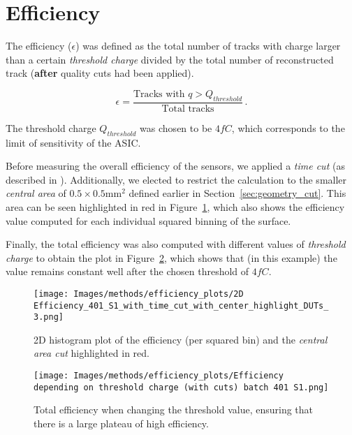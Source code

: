 \section{Efficiency}\label{sec:methods_efficiency}

The efficiency (\(\epsilon\)) was defined as the total number of tracks with charge larger than a certain \textit{threshold charge} divided by the total number of reconstructed track (\textbf{after} quality cuts had been applied).


\begin{equation*}
    \epsilon = \frac{\text{Tracks with } q>Q_{threshold}}{\text{Total tracks}}  \, .
\end{equation*}

The threshold charge \(Q_{threshold}\) was chosen to be \(4\si{fC}\), which corresponds to the limit of sensitivity of the ASIC.

Before measuring the overall efficiency of the sensors, we applied a \textit{time cut} (as described in ). Additionally, we elected to restrict the calculation to the smaller \textit{central area} of \(0.5\times0.5\unit{\milli\meter^2}\) defined earlier in Section~\ref{sec:geometry_cut}. This area can be seen highlighted in red in Figure~\ref{fig:efficiency_2D_plot}, which also shows the efficiency value computed for each individual squared binning of the surface.

Finally, the total efficiency was also computed with different values of \textit{threshold charge} to obtain the plot in Figure~\ref{fig:efficiency_depending_threshold}, which shows that (in this example) the value remains constant well after the chosen threshold of \(4\si{fC}\).

\begin{figure}[h!tbp]
    \centering
    \texttt{[image: Images/methods/efficiency\_plots/2D Efficiency\_401\_S1\_with\_time\_cut\_with\_center\_highlight\_DUTs\_3.png]}
    \captionsetup{width=\captionwidth}
    \caption{2D histogram plot of the efficiency (per squared bin) and the \textit{central area cut} highlighted in red.}
    \label{fig:efficiency_2D_plot}
\end{figure}

\begin{figure}[h!tbp]
    \centering
    \texttt{[image: Images/methods/efficiency\_plots/Efficiency depending on threshold charge (with cuts) batch 401 S1.png]}
    \caption{Total efficiency when changing the threshold value, ensuring that there is a large plateau of high efficiency.}
    \label{fig:efficiency_depending_threshold}
\end{figure}


